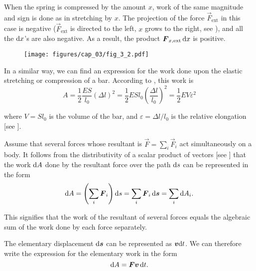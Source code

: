 \noindent
When the spring is compressed by the amount $x$, work of the same magnitude and sign is done as in stretching by $x$. The projection of the force $\vec{F}_{\text{ext}}$ in this case is negative ($\vec{F}_{\text{ext}}$ is directed to the left, $x$ grows to the right, see ), and all the $\mathrm{d} x$'s are also negative. As a result, the product $\boldsymbol{F}_{x,\text{ext}}\,\mathrm{d} x$ is positive.

\begin{figure}[t]
	\begin{center}
		\texttt{[image: figures/cap\_03/fig\_3\_2.pdf]}
		\caption[]{}
		\label{fig:3_2}
	\end{center}
	\vspace{-0.7cm}
\end{figure}

In a similar way, we can find an expression for the work done upon the elastic stretching or compression of a bar. According to , this work is
\begin{equation}\label{eq:3_14}
A = \frac{1}{2}\frac{ES}{l_0}(\Delta l)^2 = \frac{1}{2}ESl_0\left(\frac{\Delta l}{l_0}\right)^2 = \frac{1}{2}EV\varepsilon^2
\end{equation}

\noindent
where $V=Sl_0$ is the volume of the bar, and $\varepsilon=\Delta l/l_0$ is the relative elongation [see ].

Assume that several forces whose resultant is $\vec{F}=\sum_{i}\vec{F}_i$ act simultaneously on a body. It follows from the distributivity of a scalar product of vectors [see ] that the work $\mathrm{d} A$ done by the resultant force over the path $\mathrm{d} s$ can be represented in the form
\begin{equation}\label{eq:3_15}
\mathrm{d} A = \left(\sum_{i}\boldsymbol{F}_i\right)\mathrm{d} s = \sum_{i}\boldsymbol{F}_i\,\mathrm{d}\boldsymbol{s} = \sum_{i}\mathrm{d} A_i.
\end{equation}

\noindent
This signifies that the work of the resultant of several forces equals the algebraic sum of the work done by each force separately.

The elementary displacement $\mathrm{d}\boldsymbol{s}$ can be represented as $\boldsymbol{v}\mathrm{d} t$. We can therefore write the expression for the elementary work in the form
\begin{equation}\label{eq:3_16}
\mathrm{d} A = \boldsymbol{F}\boldsymbol{v}\,\mathrm{d} t.
\end{equation}

